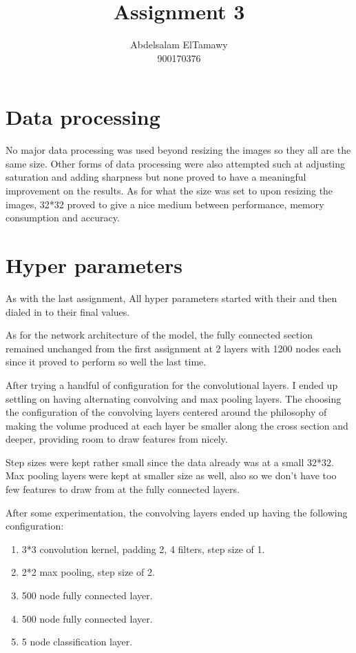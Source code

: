\documentclass{article}
\author{Abdelsalam ElTamawy\\900170376}
\title{Assignment 3}
\begin{document}
\maketitle

\section{Data processing}

No major data processing was used beyond resizing the images so they all are the same size. Other forms of data processing were also attempted such at adjusting saturation and adding sharpness but none proved to have a meaningful improvement on the results. As for what the size was set to upon resizing the images, 32*32 proved to give a nice medium between performance, memory consumption and accuracy.

\section{Hyper parameters}

As with the last assignment, All hyper parameters started with their  and then dialed in to their final values.

As for the network architecture of the model, the fully connected section remained unchanged from the first assignment at 2 layers with 1200 nodes each since it proved to perform so well the last time.

After trying a handful of configuration for the convolutional layers. I ended up settling on having alternating convolving and max pooling layers. The choosing the configuration of the convolving layers centered around the philosophy of making the volume produced at each layer be smaller along the cross section and deeper, providing room to draw features from nicely.

Step sizes were kept rather small since the data already was at a small 32*32.
Max pooling layers were kept at smaller size as well, also so we don't have too few features to draw from at the fully connected layers.

After some experimentation, the convolving layers ended up having the following configuration:
\begin{enumerate}
	\item 3*3 convolution kernel, padding 2, 4 filters, step size of 1.
	\item 2*2 max pooling, step size of 2.
	\item 500 node fully connected layer.
	\item 500 node fully connected layer.
	\item 5 node classification layer.
\end{enumerate}
\end{document}
